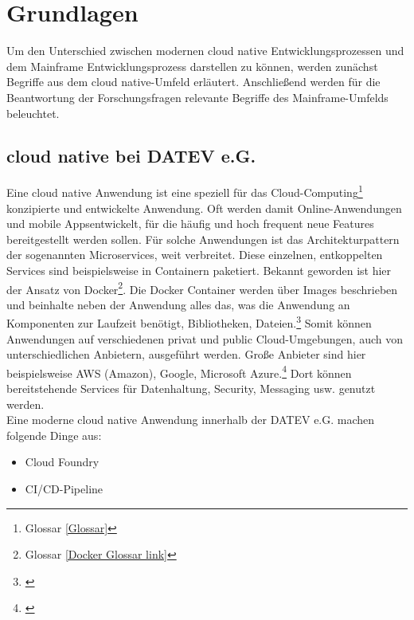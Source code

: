 \chapter{Grundlagen}\label{ch:grundlagen}
Um den Unterschied zwischen modernen cloud native Entwicklungsprozessen und dem Mainframe Entwicklungsprozess darstellen zu können, werden zunächst Begriffe aus dem cloud native-Umfeld erläutert.
Anschließend werden für die Beantwortung der Forschungsfragen relevante Begriffe des Mainframe-Umfelds beleuchtet.

\section{cloud native bei DATEV e.G.}\label{sec:cloudnative}
Eine cloud native Anwendung ist eine speziell für das Cloud-Computing\footnote{Glossar \ref{Glossar}} konzipierte und entwickelte Anwendung.
Oft werden damit Online-Anwendungen und mobile \glqq Apps\grqq entwickelt, für die häufig und hoch frequent neue Features bereitgestellt werden sollen. 
Für solche Anwendungen ist das Architekturpattern der sogenannten \glqq Microservices\grqq, weit verbreitet.
Diese einzelnen, entkoppelten Services sind beispielsweise in Containern paketiert. 
Bekannt geworden ist hier der Ansatz von Docker\footnote{Glossar \ref{Docker Glossar link}}.
Die Docker Container werden über Images beschrieben und beinhalte neben der Anwendung alles das, was die Anwendung an Komponenten zur Laufzeit benötigt, Bibliotheken, Dateien.\footnote{\cite{Vohra.2016}}
Somit können Anwendungen auf verschiedenen \glqq privat\grqq{} und \glqq public\grqq{} Cloud-Umgebungen, auch von unterschiedlichen Anbietern, ausgeführt werden.
Große Anbieter sind hier beispielsweise AWS (Amazon), Google, Microsoft Azure.\footnote{\cite{.27.2.2020}}
Dort können bereitstehende Services für Datenhaltung, Security, Messaging usw. genutzt werden. 
\cite{.23.2.2020d}\\
Eine moderne cloud native Anwendung innerhalb der DATEV e.G. machen folgende Dinge aus:
\begin{itemize}
\item \glqq Cloud Foundry\grqq
\item CI/CD-Pipeline
\end{itemize}

